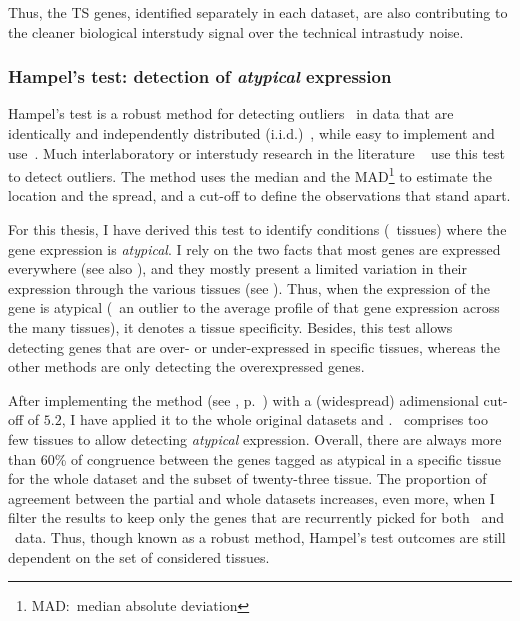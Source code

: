 Thus, the \gls{TS} genes, identified separately in each dataset,
are also contributing to the cleaner biological interstudy signal
over the technical intrastudy noise.

\subsubsection{Hampel's test: detection of \emph{atypical} expression}\label{subsub:Hampel}

Hampel's test is a robust method
for detecting outliers~
in data that are identically and independently distributed (i.i.d.)~,
while easy to implement and use~.
Much interlaboratory or interstudy research in the literature
\eg~\citet{LinsingerHampel,Lewczuk2006-wq,Rocke1983-qa,Apfalter1999-ca}
use this test to detect outliers.
The method uses the median and the \gls{MAD}\footnote{MAD:~median absolute deviation}
to estimate the location and the spread,
and a cut-off to define the observations that stand apart.

For this thesis, I have derived this test to identify conditions (\ie\ tissues)
where the gene expression is \emph{atypical}.
I rely on the two facts that
most genes are expressed everywhere 
(see also ),
and they mostly present a limited variation in their expression
through the various tissues (see ).
Thus, when the expression of the gene is atypical
(\ie\ an outlier to the average profile of that gene expression across the many tissues),
it denotes a tissue specificity.
Besides,
this test allows detecting genes that are over- or under-expressed in specific tissues,
whereas the other methods are only detecting the overexpressed genes.

After implementing the method (see , p.~\pageref{algo:hampel})
with a (widespread) adimensional cut-off of $5.2$, %
I have applied it to the whole original datasets and \setTwo.
\setOne\ comprises too few tissues to allow detecting \emph{atypical} expression.
Overall, there are always more than 60\% of congruence between the genes tagged
as atypical in a specific tissue for the whole dataset
and the subset of twenty-three tissue.
The proportion of agreement between the partial and whole datasets increases,
even more, when I filter the results to keep only the genes that are recurrently
picked for both \uhlen\ and \gtex\ data.
Thus, though known as a robust method,
Hampel's test outcomes are still dependent on the set of considered tissues.

